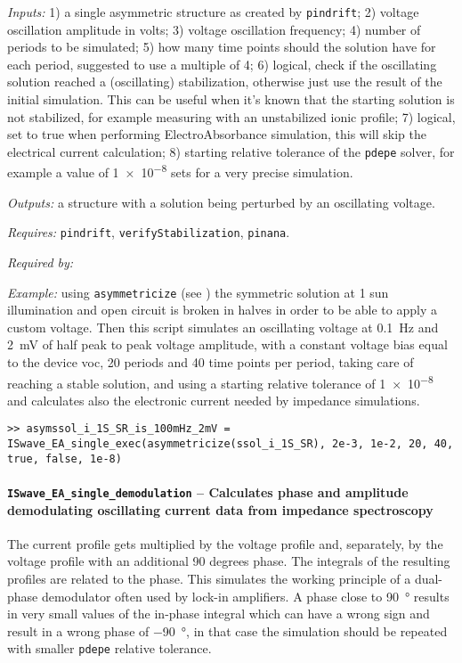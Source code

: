 	\textit{Inputs:} 1) a single asymmetric structure as created by \texttt{pindrift};
	2) voltage oscillation amplitude in volts;
	3) voltage oscillation frequency;
	4) number of periods to be simulated;
	5) how many time points should the solution have for
	each period, suggested to use a multiple of 4;
	6) logical, check if the oscillating solution reached a
	(oscillating) stabilization, otherwise just use the result of the
	initial simulation. This can be useful when it's known that the
	starting solution is not stabilized, for example measuring with an
	unstabilized ionic profile;
	7) logical, set to true when performing ElectroAbsorbance simulation,
	this will skip the electrical current calculation;
	8) starting relative tolerance of the \texttt{pdepe} solver, for example a
	value of \num{1e-8} sets for a very precise simulation.

	\textit{Outputs:} a structure with a solution being perturbed by an
	oscillating voltage.

	\textit{Requires:} \texttt{pindrift}, \texttt{verify\-Stabilization}, \texttt{pinana}.

	\textit{Required by:}

	\textit{Example:} using \texttt{asymmetricize} (see ) the symmetric solution at 1 sun illumination and open circuit is broken in halves in order to be able to apply a custom voltage.
	Then this script simulates an oscillating voltage at \SI{0.1}{\Hz} and \SI{2}{\mV} of half peak to peak voltage amplitude, with a constant voltage bias equal to the device \gls{voc},
	20 periods and 40 time points per period, taking care of reaching a stable solution,
	and using a starting relative tolerance of \num{1e-8} and calculates also the electronic current needed by impedance simulations.
	\begin{lstlisting}[style=Matlab-editor]
>> asymssol_i_1S_SR_is_100mHz_2mV = ISwave_EA_single_exec(asymmetricize(ssol_i_1S_SR), 2e-3, 1e-2, 20, 40, true, false, 1e-8)
   \end{lstlisting}

	\paragraph{\texttt{ISwave\_EA\_single\_demodulation} -- Calculates phase and amplitude demodulating oscillating current data from impedance spectroscopy}\label{ISwave_EA_single_demodulation}
	The current profile gets multiplied by the voltage profile and,
	separately, by the voltage profile with an additional 90 degrees phase.
	The integrals of the resulting profiles are related to the phase.
	This simulates the working principle of a dual-phase demodulator often
	used by lock-in amplifiers.
	A phase close to \SI{90}{\degree} results in very small values of
	the in-phase integral which can have a wrong sign and result in a wrong phase of
	\SI{-90}{\degree}, in that case the simulation should be repeated with smaller \texttt{pdepe}
	relative tolerance.

